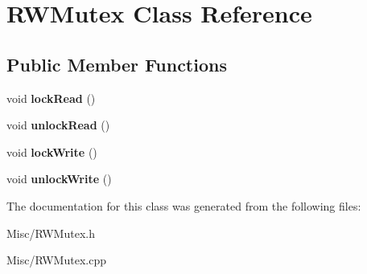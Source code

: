 \hypertarget{classRWMutex}{}\section{R\+W\+Mutex Class Reference}
\label{classRWMutex}
\subsection*{Public Member Functions}
\begin{DoxyCompactItemize}
\item 
void {\bfseries lock\+Read} ()\hypertarget{classRWMutex_ab76f003469059259e2a48e9ed6643c25}{}\label{classRWMutex_ab76f003469059259e2a48e9ed6643c25}

\item 
void {\bfseries unlock\+Read} ()\hypertarget{classRWMutex_aa71e2ce4d243c3d4c471a7fe55381b2f}{}\label{classRWMutex_aa71e2ce4d243c3d4c471a7fe55381b2f}

\item 
void {\bfseries lock\+Write} ()\hypertarget{classRWMutex_ac977d0b492c040e36a77b55ee3ae9c04}{}\label{classRWMutex_ac977d0b492c040e36a77b55ee3ae9c04}

\item 
void {\bfseries unlock\+Write} ()\hypertarget{classRWMutex_a2f145529b60c90b3eba0ac0fd547f2b2}{}\label{classRWMutex_a2f145529b60c90b3eba0ac0fd547f2b2}

\end{DoxyCompactItemize}


The documentation for this class was generated from the following files\+:\begin{DoxyCompactItemize}
\item 
Misc/R\+W\+Mutex.\+h\item 
Misc/R\+W\+Mutex.\+cpp\end{DoxyCompactItemize}

